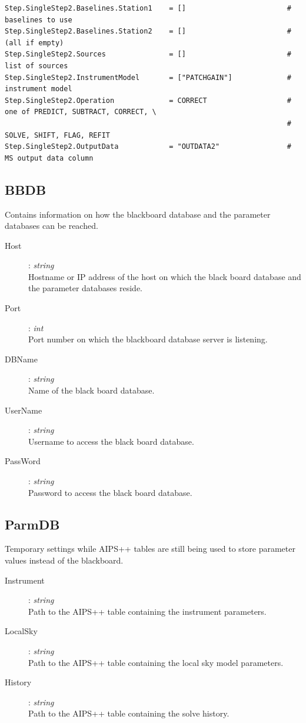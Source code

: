 \documentclass[10pt]{lofar}
\begin{document}
{\begin{verbatim}
Step.SingleStep2.Baselines.Station1    = []                        # baselines to use
Step.SingleStep2.Baselines.Station2    = []                        # (all if empty)
Step.SingleStep2.Sources               = []                        # list of sources
Step.SingleStep2.InstrumentModel       = ["PATCHGAIN"]             # instrument model
Step.SingleStep2.Operation             = CORRECT                   # one of PREDICT, SUBTRACT, CORRECT, \
                                                                   # SOLVE, SHIFT, FLAG, REFIT
Step.SingleStep2.OutputData            = "OUTDATA2"                # MS output data column
\end{verbatim}
}

\subsection*{BBDB}
\label{app-bbdb}
Contains information on how the blackboard database and the parameter databases
can be reached.
\begin{description}
\item [Host] : \emph{string} \\
    Hostname or IP address of the host on which the black board database and
    the parameter databases reside.
\item [Port] : \emph{int} \\
    Port number on which the blackboard database server is listening.
\item [DBName] : \emph{string} \\
    Name of the black board database.
\item [UserName] : \emph{string} \\
    Username to access the black board database.
\item [PassWord] : \emph{string} \\
    Password to access the black board database.
\end{description}

\subsection*{ParmDB}
\label{app-parmdb}
Temporary settings while AIPS++ tables are still being used to store parameter
values instead of the blackboard.
\begin{description}
\item [Instrument] : \emph{string} \\
    Path to the AIPS++ table containing the instrument parameters.
\item [LocalSky] : \emph{string} \\
    Path to the AIPS++ table containing the local sky model parameters.
\item [History] : \emph{string} \\
    Path to the AIPS++ table containing the solve history.
\end{description}
\end{document}
